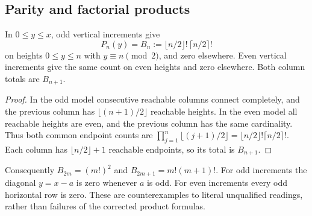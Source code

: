 \subsection{Parity and factorial products}
\begin{proposition}\label{prop:parity}
In $0\le y\le x$, odd vertical increments give
\[
P_n(y)=B_n:=\lfloor n/2\rfloor!\,\lceil n/2\rceil!
\]
on heights $0\le y\le n$ with $y\equiv n\pmod2$, and zero elsewhere. Even vertical increments give the same count on even heights and zero elsewhere. Both column totals are $B_{n+1}$.
\end{proposition}
\begin{proof}
In the odd model consecutive reachable columns connect completely, and the previous column has $\lfloor(n+1)/2\rfloor$ reachable heights. In the even model all reachable heights are even, and the previous column has the same cardinality. Thus both common endpoint counts are
$\prod_{j=1}^n\lfloor(j+1)/2\rfloor=\lfloor n/2\rfloor!\lceil n/2\rceil!$.
Each column has $\lfloor n/2\rfloor+1$ reachable endpoints, so its total is $B_{n+1}$.
\end{proof}
Consequently $B_{2m}=(m!)^2$ and $B_{2m+1}=m!(m+1)!$. For odd increments the diagonal $y=x-a$ is zero whenever $a$ is odd. For even increments every odd horizontal row is zero. These are counterexamples to literal unqualified readings, rather than failures of the corrected product formulas.
